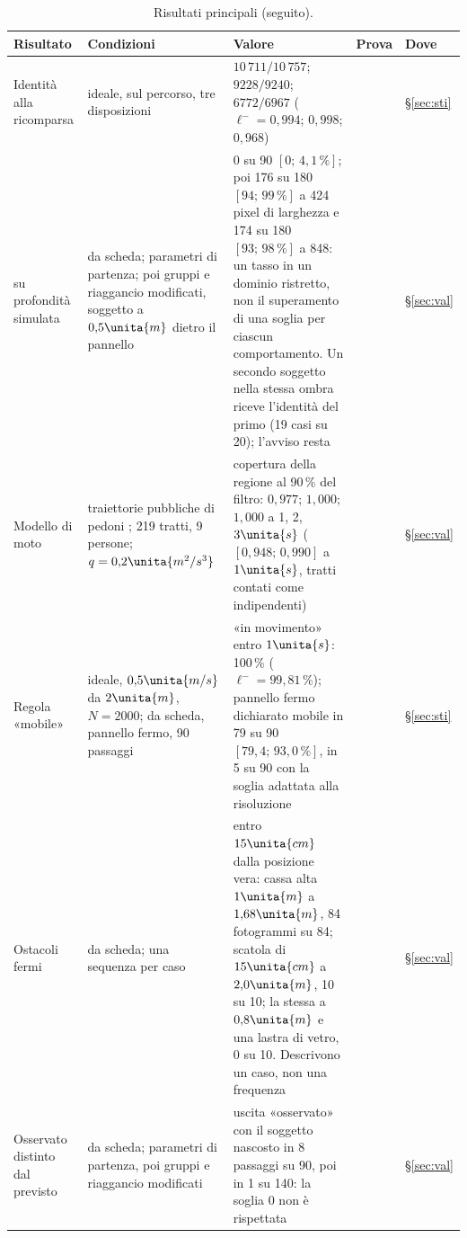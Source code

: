 \begin{table}[p]
\centering\footnotesize
\setlength{\tabcolsep}{4pt}
\caption{Risultati principali (seguito).}\label{tab:intro-sintesi-due}
\begin{tabularx}{\textwidth}{@{}>{\RaggedRight\arraybackslash}p{2.8cm}>{\RaggedRight\arraybackslash}p{4.1cm}L>{\RaggedRight\arraybackslash}p{1.2cm}>{\RaggedRight\arraybackslash}p{1.05cm}@{}}
\toprule
Risultato & Condizioni & Valore & Prova & Dove\\
\midrule
Identità alla ricomparsa & ideale, sul percorso, tre disposizioni & $10\,711/10\,757$; $9228/9240$; $6772/6967$ ($\ell^-=0{,}994$; $0{,}998$; $0{,}968$) &  & \S\ref{sec:sti}\\
\quad su profondità simulata & da scheda; parametri di partenza; poi gruppi e riaggancio modificati, soggetto a $0{,}5\unita{m}$ dietro il pannello & 0 su 90 $[0;\,4{,}1\,\%]$; poi 176 su 180 $[94;\,99\,\%]$ a 424 pixel di larghezza e 174 su 180 $[93;\,98\,\%]$ a 848: un tasso in un dominio ristretto, non il superamento di una soglia per ciascun comportamento. Un secondo soggetto nella stessa ombra riceve l'identità del primo (19 casi su 20); l'avviso resta &  & \S\ref{sec:val}\\
Modello di moto & traiettorie pubbliche di pedoni \cite{thor}; 219 tratti, 9 persone; $q=0{,}2\unita{m^2/s^3}$ & copertura della regione al 90\,\% del filtro: $0{,}977$; $1{,}000$; $1{,}000$ a 1, 2, $3\unita{s}$ ($[0{,}948;\,0{,}990]$ a $1\unita{s}$, tratti contati come indipendenti) &  & \S\ref{sec:val}\\
Regola «mobile» & ideale, $0{,}5\unita{m/s}$ da $2\unita{m}$, $N=2000$; da scheda, pannello fermo, 90 passaggi & «in movimento» entro $1\unita{s}$: 100\,\% ($\ell^-=99{,}81\,\%$); pannello fermo dichiarato mobile in 79 su 90 $[79{,}4;\,93{,}0\,\%]$, in 5 su 90 con la soglia adattata alla risoluzione &  & \S\ref{sec:sti}\\
Ostacoli fermi & da scheda; una sequenza per caso & entro $15\unita{cm}$ dalla posizione vera: cassa alta $1\unita{m}$ a $1{,}68\unita{m}$, 84 fotogrammi su 84; scatola di $15\unita{cm}$ a $2{,}0\unita{m}$, 10 su 10; la stessa a $0{,}8\unita{m}$ e una lastra di vetro, 0 su 10. Descrivono un caso, non una frequenza &  & \S\ref{sec:val}\\
Osservato distinto dal previsto & da scheda; parametri di partenza, poi gruppi e riaggancio modificati & uscita «osservato» con il soggetto nascosto in 8 passaggi su 90, poi in 1 su 140: la soglia 0 non è rispettata &  & \S\ref{sec:val}\\

\end{tabularx}
\end{table}
